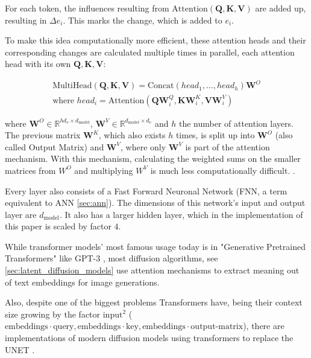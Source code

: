 For each token, the influences resulting from $\text{Attention}(\boldsymbol{Q}, \boldsymbol{K}, \boldsymbol{V})$ are added up, resulting in $\Delta e_i$. This marks the change, which is added to $e_i$.

To make this idea computationally more efficient, these attention heads and their corresponding changes are calculated multiple times in parallel, each attention head with its own $\boldsymbol{Q}, \boldsymbol{K}, \boldsymbol{V}$:

\begin{multline}
    \text{MultiHead}(\boldsymbol{Q}, \boldsymbol{K}, \boldsymbol{V}) = \text{Concat}(head_1, ..., head_h)\boldsymbol{W}^{O}  \\ 
    \text{where } head_i = \text{Attention}(\boldsymbol{QW}^{Q}_{i} , \boldsymbol{KW}^{K}_{i}, \boldsymbol{VW}^{V}_{i} )
\end{multline}

where $\boldsymbol{W}^{O} \in \mathbb{R}^{hd_v \times d_\text{model}}$, $\boldsymbol{W}^{V} \in \mathbb{R}^{d_\text{model} \times d_v}$ and $h$ the number of attention layers. The previous matrix $\boldsymbol{W}^K$, which also exists $h$ times, is split up into $\boldsymbol{W}^{O}$ (also called Output Matrix) and $\boldsymbol{W}^{V}$, where only $\boldsymbol{W}^{V}$ is part of the attention mechanism. With this mechanism, calculating the weighted sums on the smaller matrices from $W^{O}$ and multiplying $W^{V}$ is much less computationally difficult.\cite{vaswani2023attentionneed} \cite{youtube3blue1brown} \cite{elhage2021mathematical}.

Every layer also consists of a Fast Forward Neuronal Network (FNN, a term equivalent to ANN \autoref{sec:ann}). The dimensions of this network's input and output layer are $d_\text{model}$. It also has a larger hidden layer, which in the implementation of this paper \cite{vaswani2023attentionneed} is scaled by factor $4$.

While transformer models' most famous usage today is in "Generative Pretrained Transformers" like GPT-3 \cite{brown2020language}, most diffusion algorithms, see \autoref{sec:latent_diffusion_models} use attention mechanisms to extract meaning out of text embeddings for image generations.

Also, despite one of the biggest problems Transformers have, being their context size growing by the factor ${\text{input}^2}$ ($\text{embeddings} \cdot \text{query}, \text{embeddings} \cdot \text{key}, \text{embeddings} \cdot \text{output-matrix}$), there are implementations of modern diffusion models using transformers to replace the UNET \cite{ronneberger2015unetconvolutionalnetworksbiomedical} \cite{peebles2023scalablediffusionmodelstransformers}.

